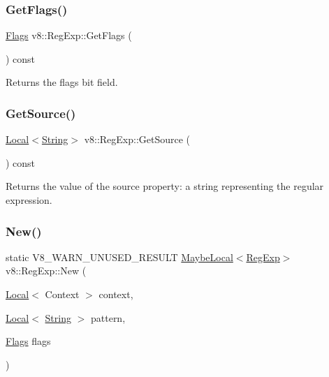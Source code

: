 \subsubsection{\texorpdfstring{Get\+Flags()}{GetFlags()}}
{\footnotesize\ttfamily \mbox{\hyperlink{classv8_1_1RegExp_aa4718a5c1f18472aff3bf51ed694fc5a}{Flags}} v8\+::\+Reg\+Exp\+::\+Get\+Flags (\begin{DoxyParamCaption}{ }\end{DoxyParamCaption}) const}

Returns the flags bit field. \mbox{\label{classv8_1_1RegExp_ad43d2879796a6991ff19954f4755778a}} 
\subsubsection{\texorpdfstring{Get\+Source()}{GetSource()}}
{\footnotesize\ttfamily \mbox{\hyperlink{classv8_1_1Local}{Local}}$<$\mbox{\hyperlink{classv8_1_1String}{String}}$>$ v8\+::\+Reg\+Exp\+::\+Get\+Source (\begin{DoxyParamCaption}{ }\end{DoxyParamCaption}) const}

Returns the value of the source property\+: a string representing the regular expression. \mbox{\label{classv8_1_1RegExp_a805f632fe98d58160773a4ba1e424b15}} 
\subsubsection{\texorpdfstring{New()}{New()}}
{\footnotesize\ttfamily static V8\+\_\+\+W\+A\+R\+N\+\_\+\+U\+N\+U\+S\+E\+D\+\_\+\+R\+E\+S\+U\+LT \mbox{\hyperlink{classv8_1_1MaybeLocal}{Maybe\+Local}}$<$\mbox{\hyperlink{classv8_1_1RegExp}{Reg\+Exp}}$>$ v8\+::\+Reg\+Exp\+::\+New (\begin{DoxyParamCaption}\item[{\mbox{\hyperlink{classv8_1_1Local}{Local}}$<$ Context $>$}]{context,  }\item[{\mbox{\hyperlink{classv8_1_1Local}{Local}}$<$ \mbox{\hyperlink{classv8_1_1String}{String}} $>$}]{pattern,  }\item[{\mbox{\hyperlink{classv8_1_1RegExp_aa4718a5c1f18472aff3bf51ed694fc5a}{Flags}}}]{flags }\end{DoxyParamCaption})\hspace{0.3cm}{\ttfamily [static]}}

